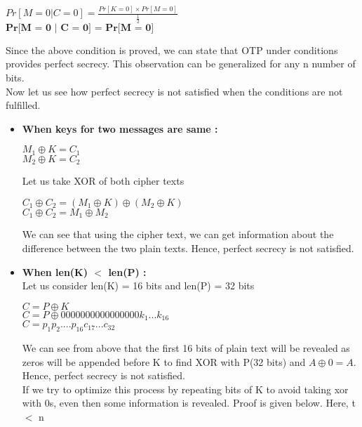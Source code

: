 \documentclass[11pt]{article}
\begin{document}
\begin{center}
    $Pr[M = 0 | C = 0] = \frac{Pr[K = 0] \times Pr[M = 0]}{\frac{1}{2}}$\\
    \vspace{3mm}
    $\textbf{Pr[M = 0 | C = 0] = Pr[M = 0]}$
\end{center}
Since the above condition is proved, we can state that OTP under conditions provides perfect secrecy. This observation can be generalized for any n number of bits.\\
Now let us see how perfect secrecy is not satisfied when the conditions are not fulfilled.
\begin{itemize}
    \item \textbf{When keys for two messages are same :}\\
    \begin{center}
        $M_1 \oplus K = C_1 $\\
        $M_2 \oplus K = C_2 $\\
    \end{center}
    Let us take XOR of both cipher texts
    \begin{center}
        $C_1 \oplus C_2 = (M_1 \oplus K) \oplus (M_2 \oplus K)$\\
        $C_1 \oplus C_2 = M_1 \oplus M_2 $
    \end{center}
    We can see that using the cipher text, we can get information about the difference between the two plain texts. Hence, perfect secrecy is not satisfied.
    \item \textbf{When len(K) $<$ len(P) : }\\
    \vspace{3mm}
    Let us consider len(K) = 16 bits and len(P) = 32 bits
    \begin{center}
        $C = P \oplus K $\\
        \vspace{3mm}
        $C = P \oplus 0000000000000000 k_1...k_{16} $\\
        \vspace{3mm}
        $C = p_1p_2....p_{16}c_{17}...c_{32}$
    \end{center}
    We can see from above that the first 16 bits of plain text will be revealed as zeros will be appended before K to find XOR with P(32 bits) and $A \oplus 0 = A $. Hence, perfect secrecy is not satisfied.\\
    \vspace{5mm}
    If we try to optimize this process by repeating bits of K to avoid taking xor with 0s, even then some information is revealed. Proof is given below. Here, t $<$ n

\end{itemize}
\end{document}
